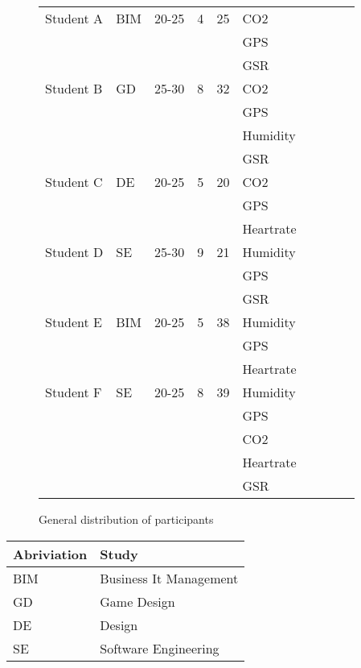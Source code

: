 \documentclass[conference]{IEEEtran}
\begin{document}
\begin{figure*}[ht]
\begin{tabular}{ | l | l | l | l | l | l | l | l | l | l | }
			Student A		& BIM			& 20-25 & 4 	& 25	& CO2 		& 				& 					& 			& 				\\
							& 				& 		& 	 	& 		& GPS		& 				& 					& 		 	& 				\\
							& 				& 		& 	 	& 		& GSR		& 				& 					& 			& 				\\ \hline
							
			Student B		& GD 			& 25-30 & 8 	& 32	& CO2		& 				& 					& 			& 				\\
							& 				& 		& 		& 		& GPS		& 				& 					& 			& 				\\
							& 				& 		& 		& 		& Humidity	& 				& 					& 			& 				\\
							& 				& 		& 		& 		& GSR		& 				& 					& 			& 				\\ \hline
							
			Student C		& DE			& 20-25 & 5		& 20	& CO2		& 				& 					& 			& 				\\ 
							& 				& 		& 		& 		& GPS		& 				& 					& 			& 				\\
							& 				& 		& 		& 		& Heartrate	& 				& 					& 			& 				\\ \hline
							
			Student D		& SE 			& 25-30	& 9		& 21	& Humidity	& 				& 					& 			& 				\\ 
							& 				& 		& 		& 		& GPS		& 				& 					& 			& 				\\ 
							& 				& 		& 		& 		& GSR		& 				& 					& 			& 				\\ \hline
							
			Student E		& BIM		 	& 20-25	& 5 	& 38	& Humidity	& 				& 					& 			& 				\\ 
							& 				& 		& 		& 		& GPS		& 				& 					& 			& 				\\ 
							& 				& 		& 		& 		& Heartrate	& 				& 					& 			& 				\\ \hline
							
			Student F		& SE 			& 20-25	& 8		& 39	& Humidity	& 				& 					& 			& 				\\ 
							& 				& 		& 		& 		& GPS		& 				& 					& 			& 				\\ 
							& 				& 		& 		& 		& CO2		& 				& 					& 			& 				\\ 
							& 			 	& 		& 		& 		& Heartrate& 				& 					& 			& 				\\ 
							& 				& 		& 		& 		& GSR		& 				& 					& 			& 				\\ \hline
			\end{tabular}
			\caption{General distribution of participants}
		\end{figure*}
		\begin{tabular}{ | l | l | }
			\hline
			Abriviation & Study 					\\ \hline \hline
			BIM			& Business It Management	\\ \hline
			GD			& Game Design				\\ \hline
			DE			& Design					\\ \hline
			SE			& Software Engineering		\\ \hline
		
		\end{tabular}
\end{document}
